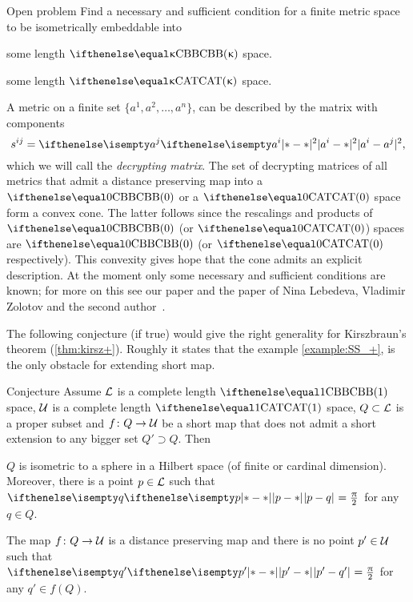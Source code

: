 \begin{thm}{Open problem}\label{open:n-point-CBB}
Find a necessary and sufficient condition for a finite metric space to be isometrically embeddable into 

\begin{subthm}{}
some length $\Alex{\kappa}$ space.
\end{subthm}

\begin{subthm}{}
some length $\CAT{\kappa}$ space.
\end{subthm}

\end{thm}

A metric on a finite set $\{a^1,a^2,\dots,a^n\}$,
can be described by the matrix with components
\[s^{ij}
=
\dist[2]{a^i}{a^j}{},\]
which we will call the \emph{decrypting matrix}.
The set of decrypting matrices of all metrics that admit a distance preserving map into a $\Alex{0}$ or a $\CAT{0}$ space 
form a convex cone. 
The latter follows since the rescalings and products of $\Alex{0}$ (or $\CAT{0}$) spaces are  $\Alex{0}$ (or $\CAT{0}$ respectively).
This convexity gives hope that the cone admits an explicit description.
At the moment only some necessary and sufficient conditions are known;
for more on this see our paper \cite{alexander-kapovitch-kirszbraun} 
and the paper of Nina Lebedeva, Vladimir Zolotov and the second author~\cite{lebedeva-petrunin-zolotov}.

The following conjecture (if true) would give the  right generality for  Kirszbraun's theorem (\ref{thm:kirsz+}).
Roughly it states that the example \ref{example:SS_+}, 
is the only obstacle for extending short map.

\begin{thm}{Conjecture}\label{conj:kirsz}
Assume $\mathcal{L}$ is a complete length $\Alex1$ space,
$\mathcal{U}$ is a complete length $\CAT1$ space,
$Q\subset \spc{L}$ is a proper subset
and $f\: Q\to\spc{U}$ be a short map that does not admit a short extension to any bigger set $Q'\supset Q$. 
Then 

\begin{subthm}{}
$Q$ is isometric to a sphere in a Hilbert space (of finite or cardinal dimension).
Moreover, there is a point $p\in \spc{L}$ such that $\dist{p}{q}{}=\tfrac{\pi}{2}$ for any $q\in Q$.
\end{subthm}

\begin{subthm}{}
The map $f\:Q\to\spc{U}$ is a distance preserving map and there is no point $p'\in \spc{U}$ such that $\dist{p'}{q'}{}=\tfrac{\pi}{2}$ for any $q'\in f(Q)$.
\end{subthm}
\end{thm}


